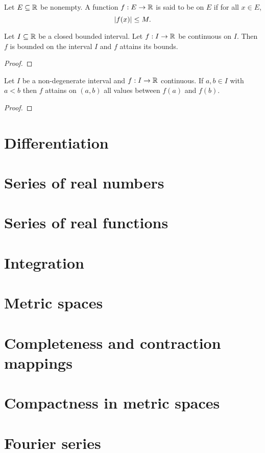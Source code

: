 \begin{definition}
  Let \(E \subseteq \mathbb{R}\) be nonempty. A function \(f : E \to \mathbb{R}\) is said to be  on \(E\) if for all \(x \in E\),
  \[\abs{f(x)} \leq M.\]
\end{definition}

\begin{theorem}
  Let \(I \subseteq \mathbb{R}\) be a closed bounded interval. Let \(f : I \to \mathbb{R}\) be continuous on \(I\). Then \(f\) is bounded on the interval \(I\) and \(f\) attains its bounds.
\end{theorem}

\begin{proof}
\end{proof}

\begin{theorem}
  Let \(I\) be a non-degenerate interval and \(f : I \to \mathbb{R}\) continuous. If \(a, b \in I\) with \(a < b\) then \(f\) attains on \((a,b)\) all values between \(f(a)\) and \(f(b)\).
\end{theorem}

\begin{proof}
\end{proof}
\section{Differentiation}

\section{Series of real numbers}

\section{Series of real functions}

\section{Integration}

\section{Metric spaces}

\section{Completeness and contraction mappings}

\section{Compactness in metric spaces}

\section{Fourier series}

